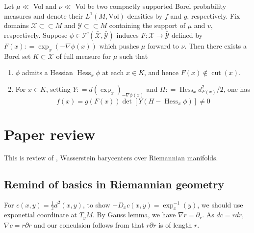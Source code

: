 \begin{thm}
	\label{thm:jacobian_identity}
	Let \( \mu \ll \) Vol and \( \nu \ll \) Vol be
	two compactly supported Borel probability measures and denote their
	\( L ^ { 1 } ( M, \text{Vol}) \) densities by \( f \) and \( g \), respectively.
	Fix domains \( \mathcal{X} \subset \subset M \) and \( \mathcal{Y} \subset \subset M \) containing the support of \( \mu \) and \( v \), respectively.
	Suppose \( \phi \in \mathcal{I} ^ { c } ( \bar { \mathcal{X} } , \bar { \mathcal{Y} } ) \) induces \( F : \mathcal{X} \longrightarrow \bar { \mathcal{Y} } \) defined by \( F ( x ) : = \exp _ { x } ( - \nabla \phi ( x ) ) \)
	which pushes \( \mu \) forward to $\nu$.
	Then there exists a Borel set \( K \subset \mathcal{X} \) of full
	measure for \( \mu \) such that
	\begin{enumerate}
		\item $\phi$ admits a Hessian \( \operatorname { Hess } _ { x } \phi \) at each \( x \in K \), and hence \( F ( x ) \notin \operatorname { cut } ( x ) \).
		\item For \( x \in K \), setting \( Y : = d \left( \exp _ { x } \right) _ { - \nabla \phi ( x ) } \) and \( H : = \operatorname { Hess } _ { x } d _ { F ( x ) } ^ { 2 } / 2 \), one
		      has
		      \[ f ( x ) = g ( F ( x ) ) \operatorname { det } \left[ Y \left( H - \operatorname { Hess } _ { x } \phi \right) \right] \neq 0 \]
	\end{enumerate}
\end{thm}

\section{Paper review}

This is review of \cite{KIM2017640},
Wasserstein barycenters over Riemannian manifolds.

\subsection{Remind of basics in Riemannian geometry}

For \( c ( x , y ) = \frac{ 1 } { 2 } d ^ { 2 } ( x , y ) \), to show \( - D _ { x } c ( x , y ) = \exp _ { x } ^ { - 1 } ( y ) \), we should use exponetial coordinate at $T_yM$.
By Gauss lemma, we have \( \nabla r = \partial _ { r } \).
As $d c = r dr$, $\nabla c = r \partial r$ and our conculsion follows from that $ r \partial r $ is of length $r$.

